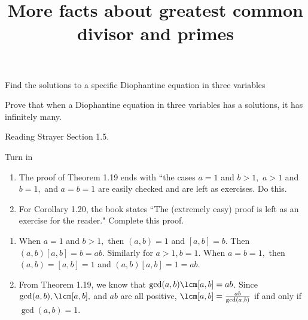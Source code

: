 \documentclass{ximera}
\title{More facts about greatest common divisor and primes}
\begin{document}
\begin{abstract}
\end{abstract}
\maketitle


\begin{obj}
    \item Find the solutions to a specific Diophantine equation in three variables
    \item Prove that when a Diophantine equation in three variables has a solutions, it has infinitely many.
\end{obj}

 
 \begin{instructorNotes}
    \begin{pre}
        \item[Reading]  Strayer Section 1.5.
        
        \item[Turn in] 
        \begin{enumerate}
         \item  The proof of Theorem 1.19 ends with ``the cases $a=1$ and $b>1,$ $a>1$ and $b=1,$ and $a=b=1$ are easily checked and are left as exercises. Do this.
        \item For Corollary 1.20, the book states ``The (extremely easy) proof is left as an exercise for the reader." Complete this proof.\end{enumerate}
        
        \begin{solution}
         
        \begin{enumerate}
         \item When $a=1$ and $b>1,$ then $(a,b)=1$ and $[a,b]=b$. Then $(a,b)[a,b]=b=ab$. Similarly for $a>1, b=1$. When $a=b=1,$ then $(a,b)=[a,b]=1$ and $(a,b)[a,b]=1=ab.$
         \item From Theorem 1.19, we know that $\gcd(a,b)\lcm[a,b]=ab$. Since $\gcd(a,b),\lcm[a,b],$ and $ab$ are all positive, $\lcm[a,b]=\frac{ab}{\gcd(a,b)}$ if and only if $\gcd(a,b)=1$.
        \end{enumerate}
        \end{solution}
        \end{pre}
 \end{instructorNotes}
\end{document}
